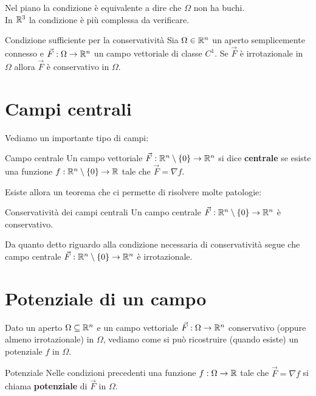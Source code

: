 Nel piano la condizione è equivalente a dire che $\Omega$ non ha buchi.\\
In $\mathbb{R}^3$ la condizione è più complessa da verificare.\\

\begin{teorema}{Condizione sufficiente per la conservatività}
  Sia $\Omega \in \mathbb{R}^n$ un aperto semplicemente connesso e $\vec F: \Omega \rightarrow \mathbb{R}^n$ un campo vettoriale di classe $C^1$. Se $\vec F$ è irrotazionale in $\Omega$ allora $\vec F$ è conservativo in $\Omega$.
\end{teorema}

\section{Campi centrali}
Vediamo un importante tipo di campi:

\begin{definizione}{Campo centrale}
  Un campo vettoriale $\vec F: \mathbb{R}^n \setminus \{0\} \rightarrow \mathbb{R}^n$ si dice \textbf{centrale} se esiste una funzione $f: \mathbb{R}^n \setminus \{0\} \rightarrow \mathbb{R}$ tale che $\vec F = \nabla f$.
\end{definizione}

Esiste allora un teorema che ci permette di risolvere molte patologie:
\begin{teorema}{Conservatività dei campi centrali}
  Un campo centrale $\vec F: \mathbb{R}^n \setminus \{0\} \rightarrow \mathbb{R}^n$ è conservativo.
\end{teorema}

\begin{osservazione}{}
  Da quanto detto riguardo alla condizione necessaria di conservatività segue che campo centrale $\vec F: \mathbb{R}^n \setminus \{0\} \rightarrow \mathbb{R}^n$ è irrotazionale.
\end{osservazione}

\section{Potenziale di un campo}

Dato un aperto $\Omega \subseteq \mathbb{R}^n$ e un campo vettoriale $\vec F: \Omega \rightarrow \mathbb{R}^n$ conservativo (oppure almeno irrotazionale) in $\Omega$, vediamo come si può ricostruire (quando esiste) un potenziale $f$ in $\Omega$.

\begin{definizione}{Potenziale}
  Nelle condizioni precedenti una funzione $f: \Omega \rightarrow \mathbb{R}$ tale che $\vec F = \nabla f$ si chiama \textbf{potenziale} di $\vec F$ in $\Omega$.
\end{definizione}

